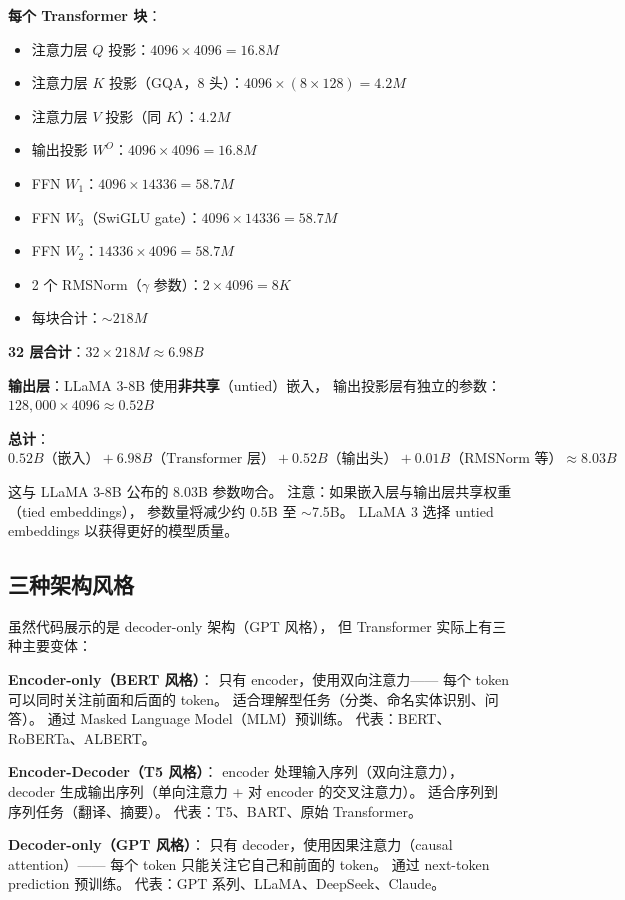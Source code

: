 \textbf{每个 Transformer 块}：
\begin{itemize}[noitemsep]
  \item 注意力层 $Q$ 投影：$4096 \times 4096 = 16.8M$
  \item 注意力层 $K$ 投影（GQA，8 头）：$4096 \times (8 \times 128) = 4.2M$
  \item 注意力层 $V$ 投影（同 $K$）：$4.2M$
  \item 输出投影 $W^O$：$4096 \times 4096 = 16.8M$
  \item FFN $W_1$：$4096 \times 14336 = 58.7M$
  \item FFN $W_3$（SwiGLU gate）：$4096 \times 14336 = 58.7M$
  \item FFN $W_2$：$14336 \times 4096 = 58.7M$
  \item 2 个 RMSNorm（$\gamma$ 参数）：$2 \times 4096 = 8K$
  \item 每块合计：$\sim 218M$
\end{itemize}

\textbf{32 层合计}：$32 \times 218M \approx 6.98B$

\textbf{输出层}：LLaMA 3-8B 使用\textbf{非共享}（untied）嵌入，
输出投影层有独立的参数：$128{,}000 \times 4096 \approx 0.52B$

\textbf{总计}：$0.52B\text{（嵌入）} + 6.98B\text{（Transformer 层）} + 0.52B\text{（输出头）} + 0.01B\text{（RMSNorm 等）} \approx 8.03B$

这与 LLaMA 3-8B 公布的 8.03B 参数吻合。
注意：如果嵌入层与输出层共享权重（tied embeddings），
参数量将减少约 0.5B 至 $\sim$7.5B。
LLaMA 3 选择 untied embeddings 以获得更好的模型质量。

\subsection{三种架构风格}

虽然代码展示的是 decoder-only 架构（GPT 风格），
但 Transformer 实际上有三种主要变体：

\textbf{Encoder-only（BERT 风格）}：
只有 encoder，使用双向注意力——
每个 token 可以同时关注前面和后面的 token。
适合理解型任务（分类、命名实体识别、问答）。
通过 Masked Language Model（MLM）预训练。
代表：BERT、RoBERTa、ALBERT。

\textbf{Encoder-Decoder（T5 风格）}：
encoder 处理输入序列（双向注意力），
decoder 生成输出序列（单向注意力 + 对 encoder 的交叉注意力）。
适合序列到序列任务（翻译、摘要）。
代表：T5、BART、原始 Transformer。

\textbf{Decoder-only（GPT 风格）}：
只有 decoder，使用因果注意力（causal attention）——
每个 token 只能关注它自己和前面的 token。
通过 next-token prediction 预训练。
代表：GPT 系列、LLaMA、DeepSeek、Claude。

